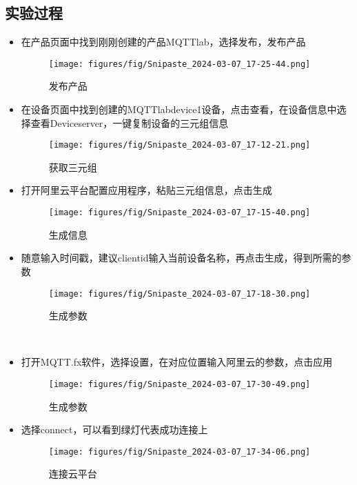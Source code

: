 \documentclass[12pt,hyperref,a4paper,UTF8]{ctexart}
\begin{document}
\subsection{实验过程}
\begin{itemize}[]
    \item 在产品页面中找到刚刚创建的产品MQTTlab，选择发布，发布产品
    \begin{figure}[H]
        \centering
        \texttt{[image: figures/fig/Snipaste\_2024-03-07\_17-25-44.png]}
        \caption{发布产品}
        \label{fig:enter-label}
    \end{figure}


    \item 在设备页面中找到创建的MQTTlabdevice1设备，点击查看，在设备信息中选择查看Deviceserver，一键复制设备的三元组信息
    \begin{figure}[H]
        \centering
        \texttt{[image: figures/fig/Snipaste\_2024-03-07\_17-12-21.png]}
        \caption{获取三元组}
        \label{fig:enter-label}
    \end{figure} 

    \item 打开阿里云平台配置应用程序，粘贴三元组信息，点击生成
    \begin{figure}[H]
        \centering
        \texttt{[image: figures/fig/Snipaste\_2024-03-07\_17-15-40.png]}
        \caption{生成信息}
        \label{fig:enter-label}
    \end{figure}

    \item 随意输入时间戳，建议clientid输入当前设备名称，再点击生成，得到所需的参数
    \begin{figure}[H]
        \centering
        \texttt{[image: figures/fig/Snipaste\_2024-03-07\_17-18-30.png]}
        \caption{生成参数}
        \label{fig:enter-label}
    \end{figure}
    
    \
    \item 打开MQTT.fx软件，选择设置，在对应位置输入阿里云的参数，点击应用
    \begin{figure}[H]
        \centering
        \texttt{[image: figures/fig/Snipaste\_2024-03-07\_17-30-49.png]}
        \caption{生成参数}
        \label{fig:enter-label}
    \end{figure}

    \item 选择connect，可以看到绿灯代表成功连接上
    \begin{figure}[H]
        \centering
        \texttt{[image: figures/fig/Snipaste\_2024-03-07\_17-34-06.png]}
        \caption{连接云平台}
        \label{fig:enter-label}
    \end{figure}
\end{itemize}
\end{document}
